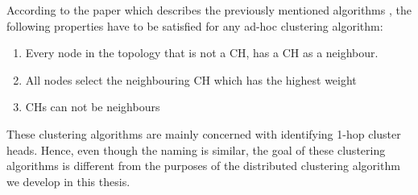 According to the paper which describes the previously mentioned algorithms \cite{Basagni}, the following properties have to be satisfied for any ad-hoc clustering algorithm:
\begin{enumerate}
	\item Every node in the topology that is not a CH, has a CH as a neighbour.
	\item All nodes select the neighbouring CH which has the highest weight
	\item CHs can not be neighbours
\end{enumerate}

These clustering algorithms are mainly concerned with identifying 1-hop cluster heads. Hence, even though the naming is similar, the goal of these clustering algorithms is
different from the purposes of the distributed clustering algorithm we develop in this thesis.  





